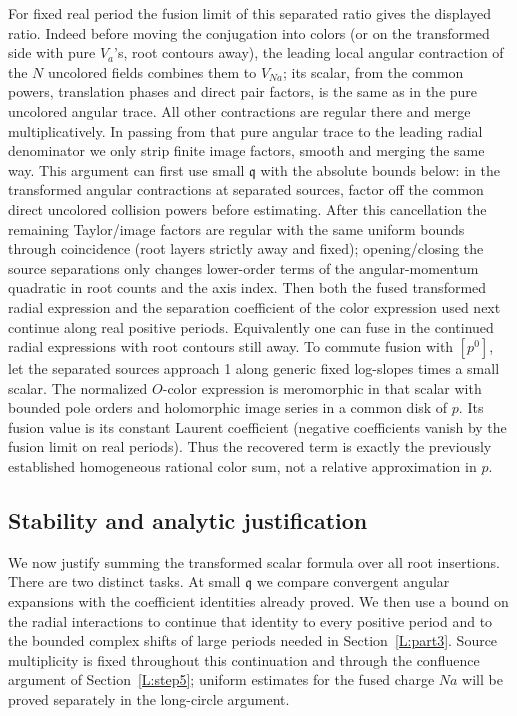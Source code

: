 For fixed real period the fusion limit of this separated ratio gives the displayed ratio. Indeed before moving the conjugation into colors (or on the transformed side with pure \(V_a\)'s, root contours away), the leading local angular contraction of the \(N\) uncolored fields combines them to \(V_{Na}\); its scalar, from the common powers, translation phases and direct pair factors, is the same as in the pure uncolored angular trace. All other contractions are regular there and merge multiplicatively. In passing from that pure angular trace to the leading radial denominator we only strip finite image factors, smooth and merging the same way. This argument can first use small \(\mathfrak q\) with the absolute bounds below: in the transformed angular contractions at separated sources, factor off the common direct uncolored collision powers before estimating. After this cancellation the remaining Taylor/image factors are regular with the same uniform bounds through coincidence (root layers strictly away and fixed); opening/closing the source separations only changes lower-order terms of the angular-momentum quadratic in root counts and the axis index. Then both the fused transformed radial expression and the separation coefficient of the color expression used next continue along real positive periods. Equivalently one can fuse in the continued radial expressions with root contours still away. To commute fusion with \([p^0]\), let the separated sources approach 1 along generic fixed log-slopes times a small scalar. The normalized \(O\)-color expression is meromorphic in that scalar with bounded pole orders and holomorphic image series in a common disk of \(p\). Its fusion value is its constant Laurent coefficient (negative coefficients vanish by the fusion limit on real periods). Thus the recovered term is exactly the previously established homogeneous rational color sum, not a relative approximation in \(p\).

\subsection{Stability and analytic justification}\label{L:step6}

We now justify summing the transformed scalar formula over all root
insertions. There are two distinct tasks. At small $\mathfrak q$ we compare
convergent angular expansions with the coefficient identities already
proved. We then use a bound on the radial interactions to continue that
identity to every positive period and to the bounded complex shifts of
large periods needed in Section~\ref{L:part3}. Source multiplicity is fixed
throughout this continuation and through the confluence argument of
Section~\ref{L:step5}; uniform estimates for the fused charge $Na$ will be
proved separately in the long-circle argument.

